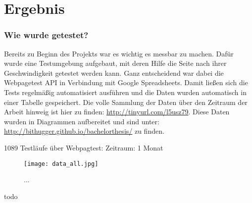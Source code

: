 \section{Ergebnis} %
\label{sec:ergebnis}
	\subsubsection{Wie wurde getestet?} %
	\label{ssub:wie_wurde_getestet}
	
		Bereits zu Beginn des Projekts war es wichtig es messbar zu machen. Dafür wurde eine Testumgebung aufgebaut, mit deren Hilfe die Seite nach ihrer Geschwindigkeit getestet werden kann. Ganz entscheidend war dabei die Webpagetest API in Verbindung mit Google Spreadsheets. Damit ließen sich die Tests regelmäßig automatisiert ausführen und die Daten wurden automatisch in einer Tabelle gespeichert. Die volle Sammlung der Daten über den Zeitraum der Arbeit hinweig ist hier zu finden: \url{http://tinyurl.com/l5usz79}. Diese Daten wurden in Diagrammen aufbereitet und sind unter: \url{http://bithugger.github.io/bachelorthesis/} zu finden.

		1089 Testläufe über Webpagtest: Zeitraum: 1 Monat

		\begin{figure}[htbp]
			\begin{center}
				\texttt{[image: data\_all.jpg]}
				\caption{...}
				\label{fig:data_all}
			\end{center}
		\end{figure}
		
		todo

